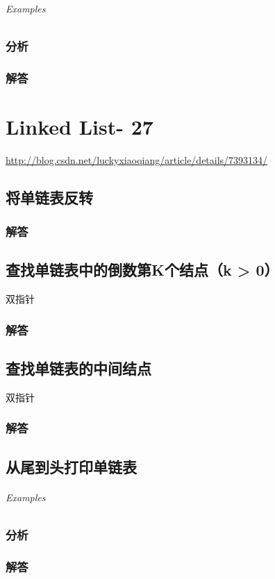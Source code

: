 \documentclass[UTF8,a4paper,12pt]{ctexbook}
\begin{document}
	\subparagraph{Examples}
	
	\subsection{分析}
	
	\subsection{解答}
\chapter{Linked List- 27}
	\url{http://blog.csdn.net/luckyxiaoqiang/article/details/7393134/}
\section{将单链表反转}
	
	\subsection{解答}
	
	
\section{查找单链表中的倒数第K个结点（k > 0）}
		双指针
	\subsection{解答}
	
	
\section{查找单链表的中间结点}
		双指针
	\subsection{解答}
	
	
\section{从尾到头打印单链表}
	
	\subparagraph{Examples}
	
	\subsection{分析}
	
	\subsection{解答}
	
\end{document}
